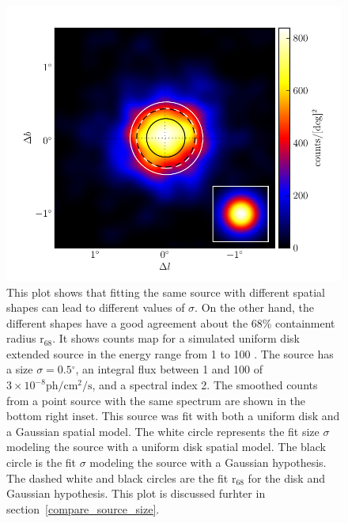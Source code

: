 \documentclass[12pt,preprint]{aastex}
\newcommand{\gev}{\text{GeV}\xspace}
\newcommand{\ph}{\text{ph}\xspace}
\newcommand{\cm}{\text{cm}\xspace}
\renewcommand{\sec}{\text{s}\xspace}
\newcommand{\rsixeight}{{\ensuremath{\text{r}_{68}}}\xspace}
\renewcommand{\deg}{\ensuremath{^\circ}\xspace}
\begin{document}
  \begin{figure}
    \begin{center}
      \includegraphics{mc_plots/compare_r68.pdf}
      \end{center}
      \caption{
      This plot shows that fitting the same source with different spatial
      shapes can lead to different values of $\sigma$. On the other
      hand, the different shapes have a good agreement about the 68\%
      containment radius \rsixeight.  It shows counts map for a simulated
      uniform disk extended source in the energy range from 1 \gev to
      100 \gev.  The source has a size $\sigma=0.5\deg$, an integral flux
      between 1 \gev and 100 \gev of $3\times 10^{-8}\ph/\cm^2/\sec$, and
      a spectral index 2.  The smoothed counts from a point source with
      the same spectrum are shown in the bottom right inset.  This source
      was fit with both a uniform disk and a Gaussian spatial model.
      The white circle represents the fit size $\sigma$ modeling the
      source with a uniform disk spatial model.  The black circle is
      the fit $\sigma$ modeling the source with a Gaussian hypothesis.
      The dashed white and black circles are the fit \rsixeight for the
      disk and Gaussian hypothesis. This plot is discussed furhter in
      section~\ref{compare_source_size}.
      }\label{compare_r68}
    \end{figure}
\end{document}
